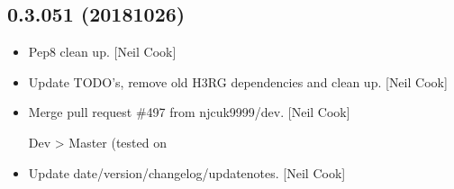 \documentclass[a4paper,10pt,english]{report}
\begin{document}
\subsection{0.3.051 (2018\sphinxhyphen{}10\sphinxhyphen{}26)}
\label{\detokenize{misc/changelog:id299}}\begin{itemize}
\item {} 
Pep8 clean up. {[}Neil Cook{]}

\item {} 
Update TODO’s, remove old H3RG dependencies and clean up. {[}Neil Cook{]}

\item {} 
Merge pull request \#497 from njcuk9999/dev. {[}Neil Cook{]}

Dev \textendash{}\textgreater{} Master (tested on 

\item {} 
Update date/version/changelog/update\sphinxhyphen{}notes. {[}Neil Cook{]}

\end{itemize}
\end{document}

